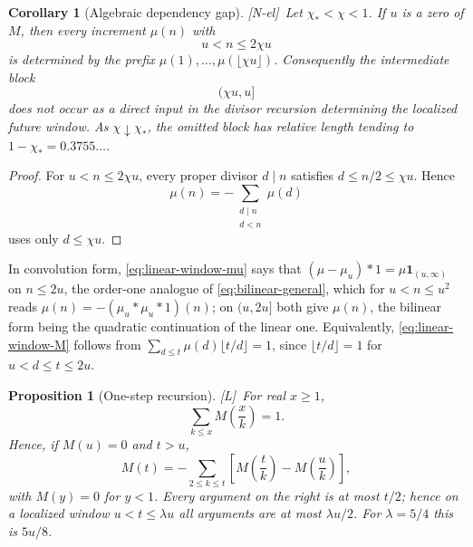 \documentclass[11pt,reqno]{amsart}
\numberwithin{equation}{section}
\theoremstyle{plain}
\newtheorem{proposition}[theorem]{Proposition}
\newtheorem{corollary}[theorem]{Corollary}
\theoremstyle{definition}
\theoremstyle{remark}
\newcommand{\tagNE}{\textup{[N-el]}}
\newcommand{\tagL}{\textup{[L]}}
\begin{document}
\begin{corollary}[Algebraic dependency gap]
\label{cor:dependency-gap}
\tagNE\ Let $\chi_*<\chi<1$.  If $u$ is a zero of $M$, then every increment
$\mu(n)$ with
\begin{equation}
u<n\le2\chi u
\end{equation}
is determined by the prefix
$\mu(1),\ldots,\mu(\lfloor\chi u\rfloor)$.  Consequently the intermediate
block
\begin{equation}
(\chi u,u]
\end{equation}
does not occur as a direct input in the divisor recursion determining the
localized future window.  As $\chi\downarrow\chi_*$, the omitted block
has relative length tending to
$1-\chi_*=0.3755\ldots$.
\end{corollary}

\begin{proof}
For $u<n\le2\chi u$, every proper divisor $d\mid n$ satisfies
$d\le n/2\le\chi u$.  Hence
\begin{equation}
\mu(n)=-\sum_{\substack{d\mid n\\ d<n}}\mu(d)
\end{equation}
uses only $d\le\chi u$.
\end{proof}

In convolution form, \eqref{eq:linear-window-mu} says that
$(\mu-\mu_u)*1=\mu\mathbf 1_{(u,\infty)}$ on $n\le2u$, the order-one analogue
of \eqref{eq:bilinear-general}, which for $u<n\le u^2$ reads
$\mu(n)=-(\mu_u*\mu_u*1)(n)$; on $(u,2u]$ both give $\mu(n)$, the
bilinear form being the quadratic continuation of the linear one. Equivalently, \eqref{eq:linear-window-M}
follows from $\sum_{d\le t}\mu(d)\lfloor t/d\rfloor=1$, since
$\lfloor t/d\rfloor=1$ for $u<d\le t\le2u$.

\begin{proposition}[One-step recursion]
\label{prop:one-step}
\tagL\ For real $x\ge1$,
\begin{equation}
\label{eq:hyperbola-M}
\sum_{k\le x}M\!\left(\frac xk\right)=1 .
\end{equation}
Hence, if $M(u)=0$ and $t>u$,
\begin{equation}
\label{eq:descent-identity}
M(t)=-\sum_{2\le k\le t}\left[M\!\left(\frac tk\right)-M\!\left(\frac uk\right)\right],
\end{equation}
with $M(y)=0$ for $y<1$. Every argument on the right is at most $t/2$; hence on a localized
window $u<t\le\lambda u$ all arguments are at most $\lambda u/2$.  For
$\lambda=5/4$ this is $5u/8$.
\end{proposition}
\end{document}
